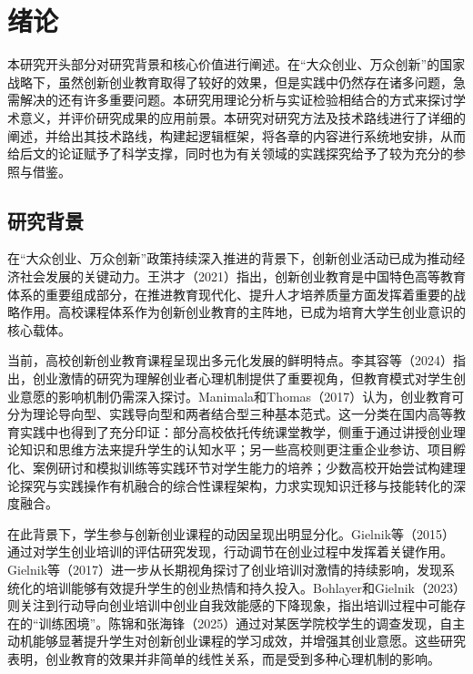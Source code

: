\chapter{绪论}

本研究开头部分对研究背景和核心价值进行阐述。在\nolinebreak[3]“大众创业、万众创新”的国家战略下，虽然创新创业教育取得了较好的效果，但是实践中仍然存在诸多问题，急需解决的还有许多重要问题。本研究用理论分析与实证检验相结合的方式来探讨学术意义，并评价研究成果的应用前景。本研究对研究方法及技术路线进行了详细的阐述，并给出其技术路线，构建起逻辑框架，将各章的内容进行系统地安排，从而给后文的论证赋予了科学支撑，同时也为有关领域的实践探究给予了较为充分的参照与借鉴。

\section{研究背景}

在\nolinebreak[3]“大众创业、万众创新”政策持续深入推进的背景下，创新创业活动已成为推动经济社会发展的关键动力。王洪才\nolinebreak[3]（2021）指出，创新创业教育是中国特色高等教育体系的重要组成部分，在推进教育现代化、提升人才培养质量方面发挥着重要的战略作用\cite{wanghongcai2021}。高校课程体系作为创新创业教育的主阵地，已成为培育大学生创业意识的核心载体。

当前，高校创新创业教育课程呈现出多元化发展的鲜明特点。李其容等\nolinebreak[3]（2024）指出，创业激情的研究为理解创业者心理机制提供了重要视角，但教育模式对学生创业意愿的影响机制仍需深入探讨\cite{liqirong2024}。Manimala和Thomas\nolinebreak[3]（2017）认为，创业教育可分为理论导向型、实践导向型和两者结合型三种基本范式\cite{Manimala2017}。这一分类在国内高等教育实践中也得到了充分印证：部分高校依托传统课堂教学，侧重于通过讲授创业理论知识和思维方法来提升学生的认知水平；另一些高校则更注重企业参访、项目孵化、案例研讨和模拟训练等实践环节对学生能力的培养；少数高校开始尝试构建理论探究与实践操作有机融合的综合性课程架构，力求实现知识迁移与技能转化的深度融合\cite{Manimala2017}。

在此背景下，学生参与创新创业课程的动因呈现出明显分化。Gielnik等\nolinebreak[3]（2015）通过对学生创业培训的评估研究发现，行动调节在创业过程中发挥着关键作用\cite{Gielnik2015}。Gielnik等\nolinebreak[3]（2017）进一步从长期视角探讨了创业培训对激情的持续影响，发现系统化的培训能够有效提升学生的创业热情和持久投入\cite{Gielnik2017}。Bohlayer和Gielnik\nolinebreak[3]（2023）则关注到行动导向创业培训中创业自我效能感的下降现象，指出培训过程中可能存在的\nolinebreak[3]“训练困境”\cite{Bohlayer2023}。陈锦和张海锋\nolinebreak[3]（2025）通过对某医学院校学生的调查发现，自主动机能够显著提升学生对创新创业课程的学习成效，并增强其创业意愿\cite{chenjin2025}。这些研究表明，创业教育的效果并非简单的线性关系，而是受到多种心理机制的影响。

